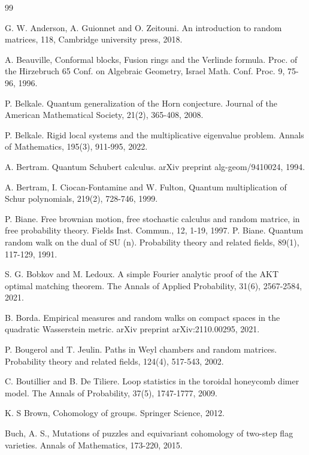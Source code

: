 \documentclass[10pt,11pt]{amsart}%
\begin{document}
\begin{thebibliography}{99}                                                                                               %

 G. W. Anderson, A. Guionnet and O. Zeitouni. An introduction to random matrices,  118, Cambridge university press, 2018.

A. Beauville, Conformal blocks, Fusion rings and the Verlinde
formula. Proc. of the Hirzebruch 65 Conf. on Algebraic Geometry, Israel Math.
Conf. Proc. 9, 75-96, 1996.

P. Belkale. Quantum generalization of the Horn conjecture. Journal of the American Mathematical Society, 21(2), 365-408, 2008.

P. Belkale. Rigid local systems and the multiplicative eigenvalue problem. Annals of Mathematics, 195(3), 911-995, 2022.

 A. Bertram. Quantum Schubert calculus. arXiv preprint alg-geom/9410024, 1994.

A. Bertram, I. Ciocan-Fontamine and W. Fulton, Quantum
multiplication of Schur polynomials, 219(2), 728-746, 1999.

P. Biane. Free brownian motion, free stochastic calculus and random matrice, in free probability theory. Fields Inst. Commun., 12, 1-19, 1997.
P. Biane. Quantum random walk on the dual of SU (n). Probability theory and related fields, 89(1), 117-129, 1991.

S. G. Bobkov and M. Ledoux. A simple Fourier analytic proof of the AKT optimal matching theorem. The Annals of Applied Probability, 31(6), 2567-2584, 2021.

B. Borda. Empirical measures and random walks on compact spaces in the quadratic Wasserstein metric. arXiv preprint arXiv:2110.00295, 2021.

P. Bougerol and T. Jeulin. Paths in Weyl chambers and random matrices. Probability theory and related fields, 124(4), 517-543, 2002.

 C. Boutillier and B. De Tiliere. Loop statistics in the toroidal honeycomb dimer model. The Annals of Probability, 37(5), 1747-1777, 2009.


 K. S Brown, Cohomology of groups. Springer Science, 2012.

Buch, A. S., Mutations of puzzles and equivariant cohomology of
two-step flag varieties. Annals of Mathematics, 173-220, 2015.


\end{thebibliography}
\end{document}
